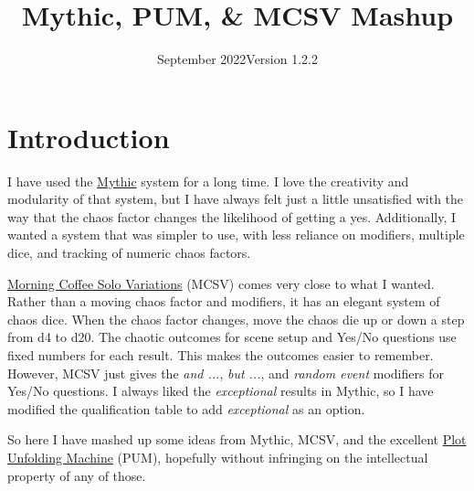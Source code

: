 

\title{Mythic, PUM, \& MCSV Mashup}
\date{September 2022\newline{}Version 1.2.2}



\mainmatter

\section{Introduction}
I have used the \href{https://www.wordmillgames.com/mythic-gme.html}{Mythic}
system for a long time. I love the creativity and modularity of that system,
but I have always felt just a little unsatisfied with the way that the chaos
factor changes the likelihood of getting a yes. Additionally, I wanted a system
that was simpler to use, with less reliance on modifiers, multiple dice, and
tracking of numeric chaos factors.

\href{https://aleaiactandaest.blogspot.com/p/downloads.html}{Morning Coffee Solo
Variations} (MCSV) comes very close to what I wanted. Rather than a moving chaos
factor and modifiers, it has an elegant system of chaos dice. When the chaos
factor changes, move the chaos die up or down a step from d4 to d20. The chaotic
outcomes for scene setup and Yes/No questions use fixed numbers for each result.
This makes the outcomes easier to remember. However, MCSV just gives the
\emph{and ...}, \emph{but ...}, and \emph{random event} modifiers for Yes/No
questions. I always liked the \emph{exceptional} results in Mythic, so I have
modified the qualification table to add \emph{exceptional} as an option.

So here I have mashed up some ideas from Mythic, MCSV, and the excellent
\href{https://jeansenvaars.itch.io/plot-unfolding-machine}{Plot Unfolding
Machine} (PUM), hopefully without infringing on the intellectual property of any
of those.

